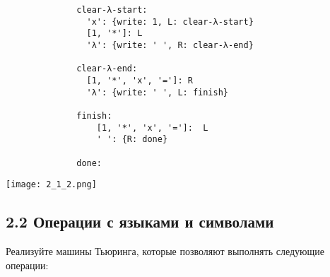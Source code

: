 \documentclass{article}
\begin{document}
\begin{enumerate}
\begin{verbatim}
              clear-λ-start: 
                'x': {write: 1, L: clear-λ-start}
                [1, '*']: L
                'λ': {write: ' ', R: clear-λ-end}
                
              clear-λ-end:
                [1, '*', 'x', '=']: R
                'λ': {write: ' ', L: finish}
                
              finish:
                  [1, '*', 'x', '=']:  L
                  ' ': {R: done}
                  
              done:
        \end{verbatim}
        \begin{center}
            \texttt{[image: 2\_1\_2.png]} \\
        \end{center}
    
\end{enumerate}


\subsection*{2.2 Операции с языками и символами}
Реализуйте машины Тьюринга, которые позволяют выполнять следующие операции:
\end{document}
